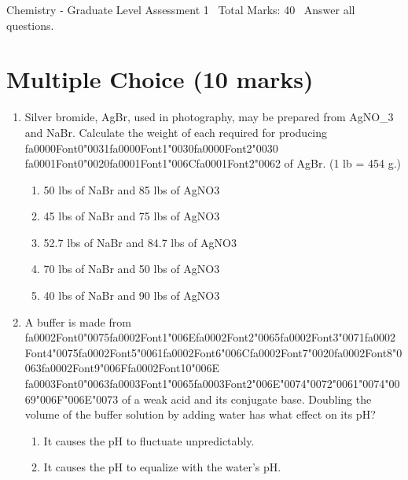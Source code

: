 \documentclass[12pt]{article}
\begin{document}
\begin{center}
Chemistry - Graduate Level Assessment 1 \
Total Marks: 40 \
Answer all questions.
\end{center}

\section*{Multiple Choice (10 marks)}
\begin{enumerate}[label=\arabic*.]
\item Silver bromide, AgBr, used in photography, may be prepared from AgNO\_3 and NaBr. Calculate
the weight of each required for producing {\csname fa0000Font0\endcsname\char"0031}{\csname fa0000Font1\endcsname\char"0030}{\csname fa0000Font2\endcsname\char"0030} {\csname fa0001Font0\endcsname\char"0020}{\csname fa0001Font1\endcsname\char"006C}{\csname fa0001Font2\endcsname\char"0062} of AgBr. (1 lb = 454 g.)
\begin{enumerate}[label=(\alph*)]
    \item 50 lbs of NaBr and 85 lbs of AgNO3
    \item 45 lbs of NaBr and 75 lbs of AgNO3
    \item 52.7 lbs of NaBr and 84.7 lbs of AgNO3
    \item 70 lbs of NaBr and 50 lbs of AgNO3
    \item 40 lbs of NaBr and 90 lbs of AgNO3
\end{enumerate}
\item A buffer is made from {\csname fa0002Font0\endcsname\char"0075}{\csname fa0002Font1\endcsname\char"006E}{\csname fa0002Font2\endcsname\char"0065}{\csname fa0002Font3\endcsname\char"0071}{\csname fa0002Font4\endcsname\char"0075}{\csname fa0002Font5\endcsname\char"0061}{\csname fa0002Font6\endcsname\char"006C}{\csname fa0002Font7\endcsname\char"0020}{\csname fa0002Font8\endcsname\char"0063}{\csname fa0002Font9\endcsname\char"006F}{\csname fa0002Font10\endcsname\char"006E} {\csname fa0003Font0\endcsname\char"0063}{\csname fa0003Font1\endcsname\char"0065}{\csname fa0003Font2\endcsname\char"006E}{\char"0074}{\char"0072}{\char"0061}{\char"0074}{\char"0069}{\char"006F}{\char"006E}{\char"0073} of a weak acid and its conjugate base. Doubling
the volume of the buffer solution by adding water has what effect on its pH?
\begin{enumerate}[label=(\alph*)]
    \item It causes the pH to fluctuate unpredictably.
    \item It causes the pH to equalize with the water's pH.

\end{enumerate}
\end{enumerate}
\end{document}
